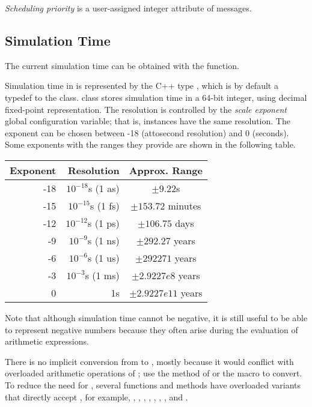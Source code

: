 \textit{Scheduling priority} is a user-assigned integer
attribute of messages.



\subsection{Simulation Time}
\label{sec:simple-modules:simulation-time}

The current simulation time can be obtained with the  function.

Simulation time in {\opp} is represented by the C++ type ,
which is by default a typedef to the  class.
 class stores simulation time in a 64-bit integer,
using decimal fixed-point representation. The resolution is controlled
by the \textit{scale exponent} global configuration variable; that is,
 instances have the same resolution. The exponent can be
chosen between -18 (attosecond resolution) and 0 (seconds).
Some exponents with the ranges they provide are shown in the following table.

\begin{center}
  \begin{tabular}{ | r | r | c | }
    \hline
    Exponent & Resolution & Approx. Range \\ \hline
     -18 & $10^{-18}$s (1 as) & $\pm 9.22$s \\
     -15 & $10^{-15}$s (1 fs) & $\pm 153.72$ minutes \\
     -12 & $10^{-12}$s (1 ps) & $\pm 106.75$ days \\
     -9  & $10^{-9}$s (1 ns)  & $\pm 292.27$ years \\
     -6  & $10^{-6}$s (1 us)  & $\pm 292271$ years \\
     -3  & $10^{-3}$s (1 ms)  & $\pm 2.9227e8$ years \\
     0   & 1s                & $\pm 2.9227e11$ years \\ \hline
  \end{tabular}
\end{center}

Note that although simulation time cannot be negative, it is still useful to
be able to represent negative numbers because they often arise
during the evaluation of arithmetic expressions.

There is no implicit conversion from  to , mostly
because it would conflict with overloaded arithmetic operations of ;
use the  method of  or the  macro
to convert. To reduce the need for , several functions and methods
have overloaded variants that directly accept , for example,
, , , , ,
, , and .

